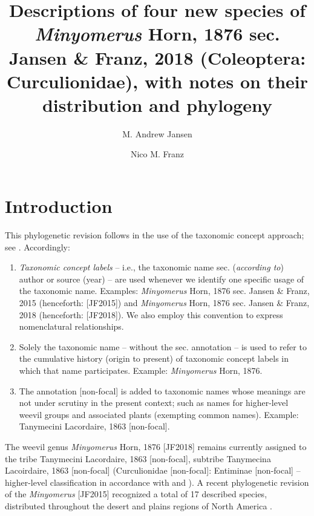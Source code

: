 \documentclass[fleqn,10pt,lineno]{wlpeerj} %
\title{Descriptions of four new species of \textit{Minyomerus} Horn, 1876 sec. Jansen \& Franz, 2018 (Coleoptera: Curculionidae), with notes on their distribution and phylogeny}
\author[1]{M. Andrew Jansen}
\author[2]{Nico M. Franz}
\affil[1]{School of Life Sciences, 427 E Tyler Mall, PO Box 874501, Tempe, AZ 85287}
\affil[2]{ASU Natural History Collections, 734 W Alameda Dr, Tempe, AZ 85282}
\begin{document}
\flushbottom
\maketitle
\thispagestyle{empty}

\section*{Introduction}\label{sec:intro}
	This phylogenetic revision follows \citet{jansen2015} in the use of the taxonomic concept approach; see \citet{fp2009, fea2016a, fea2016b}. Accordingly:
	
	\begin{enumerate}[itemsep=-0.4em]
		\item \textit{Taxonomic concept labels} -- i.e., the taxonomic name sec. (\textit{according to}) author or source (year) -- are used whenever we identify one specific usage of the taxonomic name. Examples: \textit{Minyomerus} Horn, 1876 sec. Jansen \& Franz, 2015 (henceforth: [JF2015]) and \textit{Minyomerus} Horn, 1876 sec. Jansen \& Franz, 2018 (henceforth: [JF2018]). We also employ this convention to express nomenclatural relationships. 
		\item Solely the taxonomic name -- without the sec. annotation -- is used to refer to the cumulative history (origin to present) of taxonomic concept labels in which that name participates. Example: \textit{Minyomerus} Horn, 1876.
		\item The annotation [non-focal] is added to taxonomic names whose meanings are not under scrutiny in the present context; such as names for higher-level weevil groups and associated plants (exempting common names). Example: Tanymecini Lacordaire, 1863 [non-focal].
	\end{enumerate}
	
	The weevil genus \textit{Minyomerus} Horn, 1876 [JF2018] remains currently assigned to the tribe Tanymecini Lacordaire, 1863 [non-focal], subtribe Tanymecina Lacoirdaire, 1863 [non-focal] (Curculionidae [non-focal]: Entiminae [non-focal] -- higher-level classification in accordance with \citealt{alonso1999} and \citealt{bouchard2011}). 
	A recent phylogenetic revision of the \textit{Minyomerus} [JF2015] recognized a total of 17 described species, distributed throughout the desert and plains regions of North America \citep{jansen2015}.
	
\end{document}
